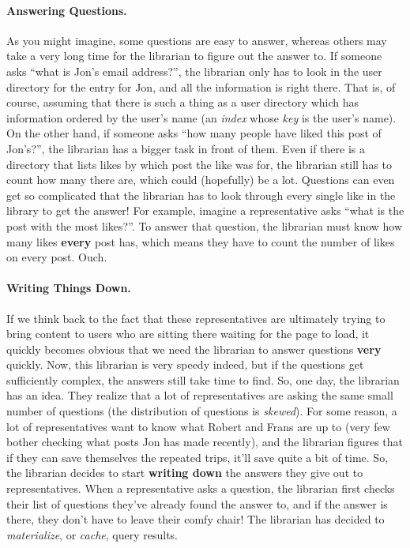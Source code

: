 \paragraph{Answering Questions.}
%
As you might imagine, some questions are easy to answer, whereas others may take
a very long time for the librarian to figure out the answer to. If someone asks
``what is Jon's email address?'', the librarian only has to look in the user
directory for the entry for Jon, and all the information is right there. That is, of
course, assuming that there is such a thing as a user directory which has
information ordered by the user's name (an \textit{index} whose \textit{key} is
the user's name). On the other hand, if someone asks ``how many people have
liked this post of Jon's?'', the librarian has a bigger task in front of them.
Even if there is a directory that lists likes by which post the like was for,
the librarian still has to count how many there are, which could (hopefully) be
a lot. Questions can even get so complicated that the librarian has to look
through every single like in the library to get the answer! For example, imagine
a representative asks ``what is the post with the most likes?''. To answer that
question, the librarian must know how many likes \textbf{every} post has, which
means they have to count the number of likes on every post. Ouch.

\paragraph{Writing Things Down.}
%
If we think back to the fact that these representatives are ultimately trying to
bring content to users who are sitting there waiting for the page to load, it
quickly becomes obvious that we need the librarian to answer questions
\textbf{very} quickly. Now, this librarian is very speedy indeed, but if the
questions get sufficiently complex, the answers still take time to find. So, one
day, the librarian has an idea. They realize that a lot of representatives are
asking the same small number of questions (the distribution of questions is
\textit{skewed}). For some reason, a lot of representatives want to know what
Robert and Frans are up to (very few bother checking what posts Jon has made
recently), and the librarian figures that if they can save themselves the
repeated trips, it'll save quite a bit of time. So, the librarian decides to
start \textbf{writing down} the answers they give out to representatives. When a
representative asks a question, the librarian first checks their list of
questions they've already found the answer to, and if the answer is there, they
don't have to leave their comfy chair! The librarian has decided to
\textit{materialize}, or \textit{cache}, query results.

